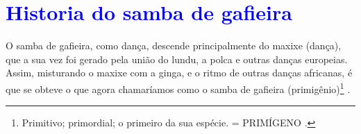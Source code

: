 

\chapter{\textcolor{blue}{Historia do samba de gafieira}}
\label{cap:sambagafieira}


O samba de gafieira, como dança, descende principalmente do maxixe (dança),
que a sua vez foi gerado  pela união do  lundu, 
a polca e outras danças europeias.
Assim, misturando o maxixe com a ginga, e o ritmo de outras danças africanas, 
é que se obteve o que agora chamaríamos como o samba de gafieira (primigênio)\footnote{
Primitivo; primordial; o primeiro da sua espécie. = PRIMÍGENO \cite{priberamprimigenio}.
} \cite[pp. 139]{perna2002samba}.

